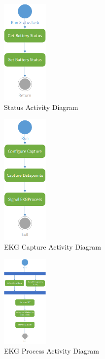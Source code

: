 \documentclass[12pt]{article} %
\begin{document}
    \begin{figure}[H]
      \centering
      \includegraphics[width=0.2\textwidth]{../design/Status_activity.png}
      \caption{Status Activity Diagram}
      \label{fig:statusActivity}
    \end{figure}

    \begin{figure}[H]
      \centering
      \includegraphics[width=0.2\textwidth]{../design/ekgCapture_activity.png}
      \caption{EKG Capture Activity Diagram}
      \label{fig:ekgCaptureActivity}
    \end{figure}

		
    \begin{figure}[H]
      \centering
      \includegraphics[width=0.2\textwidth]{../design/ekgProcess_activity.png}
      \caption{EKG Process Activity Diagram}
      \label{fig:ekgProcessActivity}
    \end{figure}
		
\end{document}
